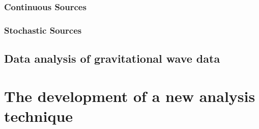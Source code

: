 \documentclass{kentigern}
\begin{document}
\section{Continuous Sources}
\label{sec:continuous-sources}

\section{Stochastic Sources}
\label{sec:stochastic-sources}



\chapter{Data analysis of gravitational wave data}
\label{cha:data-analys-grav}



\part{The development of a new analysis technique}
\label{part:devel-new-analys}


\glsaddall
{}
\printglossaries
\end{document}
